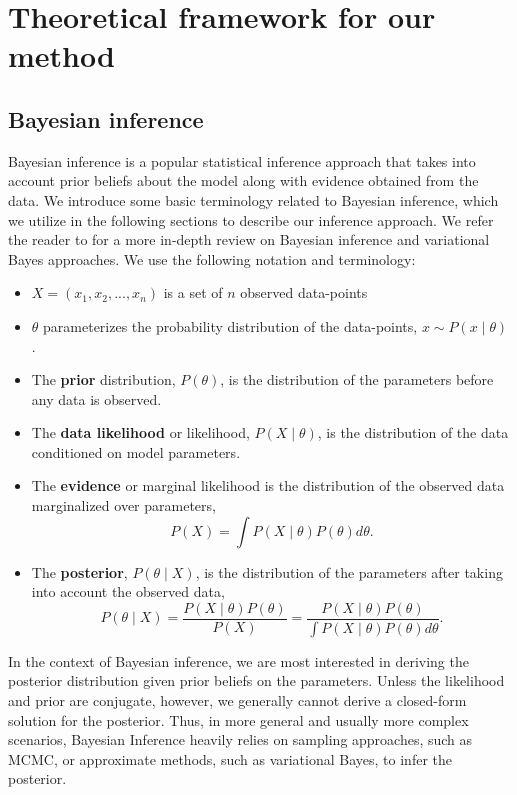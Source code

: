 \section{Theoretical framework for our method}
\label{sec:ch4-theory}
\subsection{Bayesian inference}
Bayesian inference is a popular statistical inference approach that takes into account prior beliefs about the model along with evidence obtained from the data.
%
We introduce some basic terminology related to Bayesian inference, which we utilize in the following sections to describe our inference approach.
%
We refer the reader to \cite{blei2017variational,bishop2006pattern} for a more in-depth review on Bayesian inference and variational Bayes approaches.
%
We use the following notation and terminology:
%
\begin{itemize}
    \item $X = (x_1, x_2, ..., x_n)$ is a set of $n$ observed data-points 
    \item $\theta$ parameterizes the probability distribution of the data-points, $x \sim P(x \mid \theta)$.
    \item The \textbf{prior} distribution, $P(\theta)$, is the distribution of the parameters before any data is observed.
    \item The \textbf{data likelihood} or likelihood, $P(X \mid \theta)$, is the distribution of the data conditioned on model parameters.
    \item The \textbf{evidence} or marginal likelihood is the distribution of the observed data marginalized over parameters,
    \begin{equation}
        P(X) = \int P(X \mid \theta) P(\theta) d \theta \nonumber.
    \end{equation} 
    
    \item The \textbf{posterior}, $P(\theta \mid X)$, is the distribution of the parameters after taking into account the observed data,
    \begin{equation}
        P(\theta \mid X) = \frac{P(X \mid \theta) P(\theta)}{P(X)} = \frac{P(X \mid \theta) P(\theta)}{\int P(X \mid \theta) P(\theta) d \theta} \nonumber.
    \end{equation}
    
\end{itemize}
%

%
In the context of Bayesian inference, we are most interested in deriving the posterior distribution given prior beliefs on the parameters.
%
Unless the likelihood and prior are conjugate, however, we generally cannot derive a closed-form solution for the posterior.
%
Thus, in more general and usually more complex scenarios, Bayesian Inference heavily relies on sampling approaches, such as MCMC, or approximate methods, such as variational Bayes, to infer the posterior.
